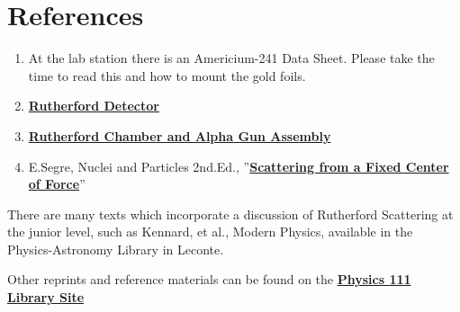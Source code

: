 \documentclass{../lab}
\begin{document}
\section{References}
\label{sec:References}

\begin{enumerate}
    \item At the lab station there is an Americium-241 Data Sheet. Please take the time to read this and how to mount the gold foils.

    \item  \href{http://physics111.lib.berkeley.edu/Physics111/Reprints/RUT/RUT\_Detector\_018.JPG}{\textbf{Rutherford Detector}}

    \item   \href{http://physics111.lib.berkeley.edu/Physics111/Reprints/RUT/RUT\_Chamber\_017.JPG}{\textbf{Rutherford Chamber and Alpha Gun Assembly}}

    \item E.Segre, Nuclei and Particles 2nd.Ed., ''\href{http://physics111.lib.berkeley.edu/Physics111/Reprints/RUT/Scattering\%20From\%20Center\%20appendix\%20a.pdf}{\textbf{Scattering from a Fixed Center of Force}}''

\end{enumerate}

There are many texts which incorporate a discussion of Rutherford Scattering at the junior level, such as Kennard, et al., Modern Physics, available in the Physics-Astronomy Library in Leconte.

Other reprints and reference materials can be found on the \href{http://physics111.lib.berkeley.edu/Physics111/Reprints/RUT/RUT\_index.html}{\textbf{Physics 111 Library Site}}
\end{document}
